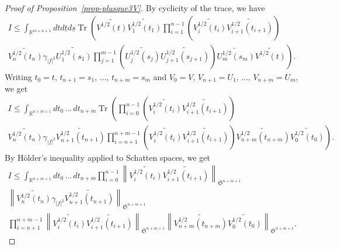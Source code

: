 \documentclass[AHL, Unicode, longabstracts,published]{cedram}
\newcommand{\R}{\mathbb{R}}
\DeclareMathOperator{\Tr}{Tr}
\newcommand{\frkS}{\mathfrak{S}}
\begin{document}
\begin{proof}[Proof of Proposition~\ref{prop-plusque3V}]
By cyclicity of the trace, we have
\begin{multline*}
I \leq \int_{\R^{m+n+1}} dtd\underline t d\underline s \Tr\left(\widetilde {V^{1/2}(t)} \widetilde{V_1^{1/2}(t_1)} \prod_{i=1}^{n-1} \left(\widetilde{ V_i^{1/2}(t_i)}\widetilde{ V_{i+1}^{1/2}(t_{i+1})} \right)\right.\\
\left.\widetilde{V_n^{1/2}(t_n)} \gamma_{|f|^2} \widetilde{U_1^{1/2}(s_1)} \prod_{j=1}^{m-1}\left(\widetilde{U_j^{1/2}(s_j)} \widetilde{U_{j+1}^{1/2}(s_{j+1})}\right) \widetilde{U_m^{1/2}(s_m)} \widetilde {V^{1/2}(t)}\right).
\end{multline*}
Writing $t_0 = t$, $t_{n+1} = s_1,\,\hdots,\,t_{n+m} = s_m$ and $V_0 = V$, $V_{n+1} = U_1,\,\hdots,\,V_{n+m} = U_m$, we get
\begin{multline*}
I \leq \int_{\R^{n+m+1}} dt_0\,\hdots\,dt_{n+m} \Tr\left(\prod_{i=0}^{n-1} \left(\widetilde{V_i^{1/2}(t_i)}\widetilde{V_{i+1}^{1/2}\left(t_{i+1}\right)} \right)\right.\\
\left.\widetilde{V_n^{1/2}(t_n)} \gamma_{|f|^2} \widetilde{V_{n+1}^{1/2}\left(t_{n+1}\right)} \prod_{i=n+1}^{n+m-1}\left(\widetilde{V_i^{1/2}(t_i)} \widetilde{V_{i+1}^{1/2}\left(t_{i+1}\right)}\right) \widetilde{V_{n+m}^{1/2}\left(t_{n+m}\right)} \widetilde {V_0^{1/2}(t_0)}\right).
\end{multline*}
By H\"older's inequality applied to Schatten spaces, we get
\begin{multline*}
I \leq \int_{\R^{n+m+1}} dt_0\,\hdots\,dt_{n+m} \prod_{i=0}^{n-1} \left\|\widetilde{ V_i^{1/2}(t_i)}\widetilde{V_{i+1}^{1/2}\left(t_{i+1}\right)} \right\|_{\frkS^{n+m+1}}\\
\left\|\widetilde{V_n^{1/2}(t_n)} \gamma_{|f|^2} \widetilde{V_{n+1}^{1/2}\left(t_{n+1}\right)} \right\|_{\frkS^{n+m+1}}\\
\prod_{i=n+1}^{n+m-1}\left\| \widetilde{V_i^{1/2}(t_i)} \widetilde{V_{i+1}^{1/2}(t_{i+1})} \right\|_{\frkS^{n+m+1}}\left\| \widetilde{V_{n+m}^{1/2}\left(t_{n+m}\right)} \widetilde {V_0^{1/2}(t_0)} \right\|_{\frkS^{n+m+1}}.
\end{multline*}


\end{proof}
\end{document}
